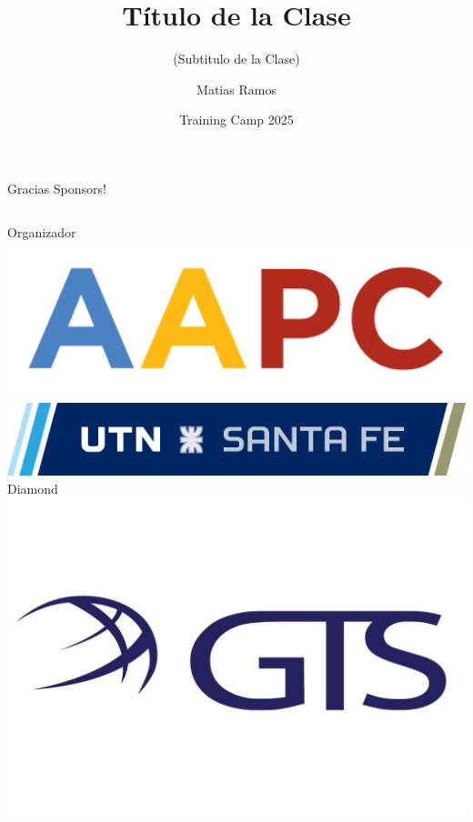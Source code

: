\documentclass{beamer}
\title %
{Título de la Clase}
\subtitle{(Subtitulo de la Clase)}
\author[Matias Ramos]{Matias Ramos}
\institute[]{Universidad Tecnológica Nacional - Facultad Regional Santa Fe}
\date[TC 2025]{Training Camp 2025}
\begin{document}
\frame{\titlepage}



\begin{frame}{Gracias Sponsors!}
    \begin{columns}[t]
        \centering
        Organizador\\
        \vspace{0.5cm}
        \includegraphics[width=1\textwidth,keepaspectratio]{logos/aapc.png}
        \includegraphics[width=1\textwidth,keepaspectratio]{logos/utn_santafe.png}
        \centering
        Diamond\\
        \includegraphics[width=1\textwidth,keepaspectratio]{logos/GTSlogo.jpeg}
    \end{columns}

\end{frame}
\end{document}
